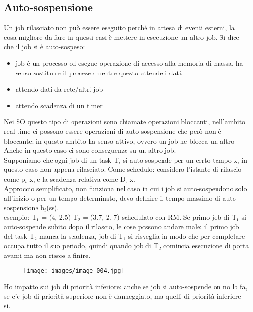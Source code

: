 \documentclass[12pt, oneside]{extbook}
\begin{document}
\subsection{Auto-sospensione}
Un job rilasciato non può essere eseguito perché in attesa di eventi esterni, la cosa migliore da fare in questi casi è mettere in esecuzione un altro job. Si dice che il job si è auto-sospeso:
\begin{itemize}
\item job è un processo ed esegue operazione di accesso alla memoria di massa, ha senso sostituire il processo mentre questo attende i dati.
\item attendo dati da rete/altri job
\item attendo scadenza di un timer
\end{itemize}
Nei SO questo tipo di operazioni sono chiamate operazioni bloccanti, nell'ambito real-time ci possono essere operazioni di auto-sospensione che però non è bloccante: in questo ambito ha senso attivo, ovvero un job ne blocca un altro. Anche in questo caso ci sono conseguenze su un altro job.\\ Supponiamo che ogni job di un task T$_{i}$ si auto-sospende per un certo tempo x, in questo caso non appena rilasciato. Come schedulo: considero l'istante di rilascio come p$_{i}$-x, e la scadenza relativa come D$_{i}$-x.\\ Approccio semplificato, non funziona nel caso in cui i job si auto-sospendono solo all'inizio o per un tempo determinato, devo definire il tempo massimo di auto-sospensione b$_{i}$(ss).\\ esempio: T$_{1}$ = (4, 2.5) T$_{2}$ = (3.7, 2, 7) schedulato con RM. Se primo job di T$_{1}$ si auto-sospende subito dopo il rilascio, le cose possono andare male: il primo job del task T$_{2}$ manca la scadenza, job di T$_{1}$ si risveglia in modo che per completare occupa tutto il suo periodo, quindi quando job di T$_{2}$ comincia esecuzione di porta avanti ma non riesce a finire.\\
\begin{figure}[!h]
\centering
\texttt{[image: images/image-004.jpg]}
\end{figure}
Ho impatto sui job di priorità inferiore: anche se job si auto-sospende on no lo fa, se c'è job di priorità superiore non è danneggiato, ma quelli di priorità inferiore si.
\end{document}
